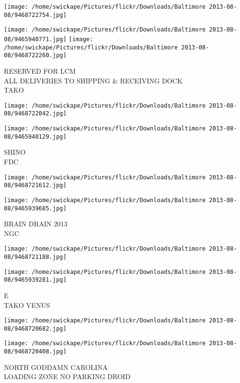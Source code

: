 \documentclass[10pt,letterpaper]{article}
\begin{document}
\texttt{[image: /home/swickape/Pictures/flickr/Downloads/Baltimore 2013-08-08/9468722754.jpg]}

\vspace{0.25in}
\texttt{[image: /home/swickape/Pictures/flickr/Downloads/Baltimore 2013-08-08/9465940771.jpg]}
\texttt{[image: /home/swickape/Pictures/flickr/Downloads/Baltimore 2013-08-08/9468722260.jpg]}

RESERVED FOR LCM\\
ALL DELIVERIES TO SHIPPING \& RECEIVING DOCK\\
TAKO
\pagebreak

\texttt{[image: /home/swickape/Pictures/flickr/Downloads/Baltimore 2013-08-08/9468722042.jpg]}

\vspace{0.25in}
\texttt{[image: /home/swickape/Pictures/flickr/Downloads/Baltimore 2013-08-08/9465940129.jpg]}

SHINO\\
FDC
\pagebreak

\texttt{[image: /home/swickape/Pictures/flickr/Downloads/Baltimore 2013-08-08/9468721612.jpg]}

\vspace{0.25in}
\texttt{[image: /home/swickape/Pictures/flickr/Downloads/Baltimore 2013-08-08/9465939685.jpg]}

BRAIN DRAIN 2013\\
NGC
\pagebreak

\texttt{[image: /home/swickape/Pictures/flickr/Downloads/Baltimore 2013-08-08/9468721188.jpg]}

\vspace{0.25in}
\texttt{[image: /home/swickape/Pictures/flickr/Downloads/Baltimore 2013-08-08/9465939281.jpg]}

E\\
TAKO VENUS
\pagebreak

\texttt{[image: /home/swickape/Pictures/flickr/Downloads/Baltimore 2013-08-08/9468720682.jpg]}

\vspace{0.25in}
\texttt{[image: /home/swickape/Pictures/flickr/Downloads/Baltimore 2013-08-08/9468720408.jpg]}

NORTH GODDAMN CAROLINA\\
LOADING ZONE NO PARKING DROID
\pagebreak
\end{document}
